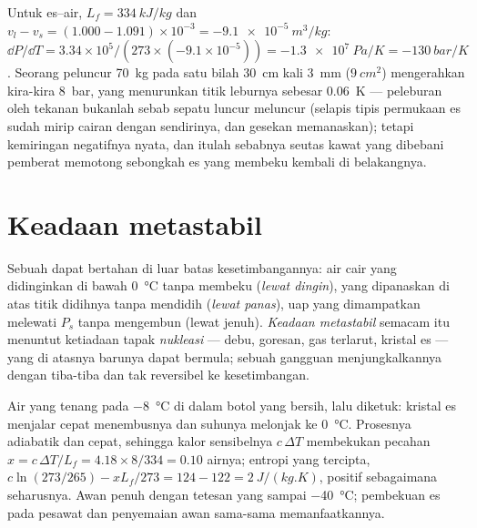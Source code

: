 \begin{example}\label{ex:b1:phase-changes:skate}
Untuk es--air, $L_f = \qty{334}{kJ/kg}$ dan $v_l - v_s = (1.000 - 1.091)
\times 10^{-3} = \qty{-9.1e-5}{m^3/kg}$: $\dd P/\dd T = 3.34 \times 10^5/(273 \times
(-9.1 \times 10^{-5})) = \qty{-1.3e7}{Pa/K} = \qty{-130}{bar/K}$. Seorang peluncur
\qty{70}{kg} pada satu bilah \qty{30}{cm} kali \qty{3}{mm} ($\qty{9}{cm^2}$) mengerahkan
kira-kira \qty{8}{bar}, yang menurunkan titik leburnya sebesar \qty{0.06}{K} --- peleburan oleh tekanan bukanlah sebab sepatu luncur meluncur (selapis
tipis permukaan es sudah mirip cairan dengan sendirinya, dan gesekan memanaskan);
tetapi kemiringan negatifnya nyata, dan itulah sebabnya seutas kawat yang dibebani
pemberat memotong sebongkah es yang membeku kembali di belakangnya.
\end{example}

\section{Keadaan metastabil}

\begin{definition}\label{def:b1:phase-changes:metastable}
Sebuah  dapat bertahan di luar batas kesetimbangannya: air cair
yang didinginkan di bawah \qty{0}{\degreeCelsius} tanpa membeku (\emph{lewat dingin}),
yang dipanaskan di atas titik didihnya tanpa mendidih (\emph{lewat panas}),
uap yang dimampatkan melewati $P_s$ tanpa mengembun (lewat jenuh).
\emph{Keadaan metastabil} semacam itu menuntut ketiadaan tapak \emph{nukleasi}
--- debu, goresan, gas terlarut, kristal es --- yang di atasnya
 barunya dapat bermula; sebuah gangguan menjungkalkannya dengan tiba-tiba dan tak reversibel
ke kesetimbangan.
\end{definition}

\begin{example}\label{ex:b1:phase-changes:supercooled}
Air yang tenang pada \qty{-8}{\degreeCelsius} di dalam botol yang bersih, lalu diketuk: kristal
es menjalar cepat menembusnya dan suhunya melonjak ke
\qty{0}{\degreeCelsius}. Prosesnya adiabatik dan cepat, sehingga kalor
sensibelnya $c\,\Delta T$ membekukan pecahan $x = c\,\Delta T/L_f = 4.18 \times 8/334 =
0.10$ airnya; entropi yang tercipta, $c\ln(273/265) - xL_f/273 =
124 - 122 = \qty{+2}{J/(kg.K)}$, positif sebagaimana seharusnya. Awan
penuh dengan tetesan yang  sampai \qty{-40}{\degreeCelsius}; pembekuan es
pada pesawat dan penyemaian awan sama-sama memanfaatkannya.
\end{example}

